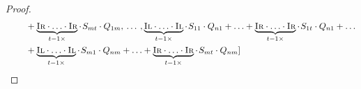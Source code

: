 \begin{proof}
\begin{equation}
\begin{split}
       & \hspace{22pt}  + \underbrace{\textsc{Ir} \cdot \ldots \cdot \textsc{Ir}}_{t-1 \times}\cdot \hspace{1pt} S_{mt} \cdot Q_{1m}, \hspace{2pt} \ldots  \hspace{2pt},  \underbrace{\textsc{Il} \cdot \ldots \cdot \textsc{Il}}_{t-1 \times} \cdot \hspace{1pt} S_{11} \cdot Q_{n1} + \ldots +   \underbrace{\textsc{Ir} \cdot \ldots \cdot \textsc{Ir}}_{t-1 \times}\cdot \hspace{1pt} S_{1t} \cdot Q_{n1} + \ldots   \\
       & \hspace{22pt} +  \underbrace{\textsc{Il} \cdot \ldots \cdot \textsc{Il}}_{t-1 \times} \cdot\hspace{1pt} S_{m1} \cdot Q_{nm} + \ldots + \underbrace{\textsc{Ir} \cdot \ldots \cdot \textsc{Ir}}_{t-1 \times}\cdot \hspace{1pt} S_{mt} \cdot Q_{nm}]
    \end{split}
  \end{equation}
  
  
  
  

\end{proof}
